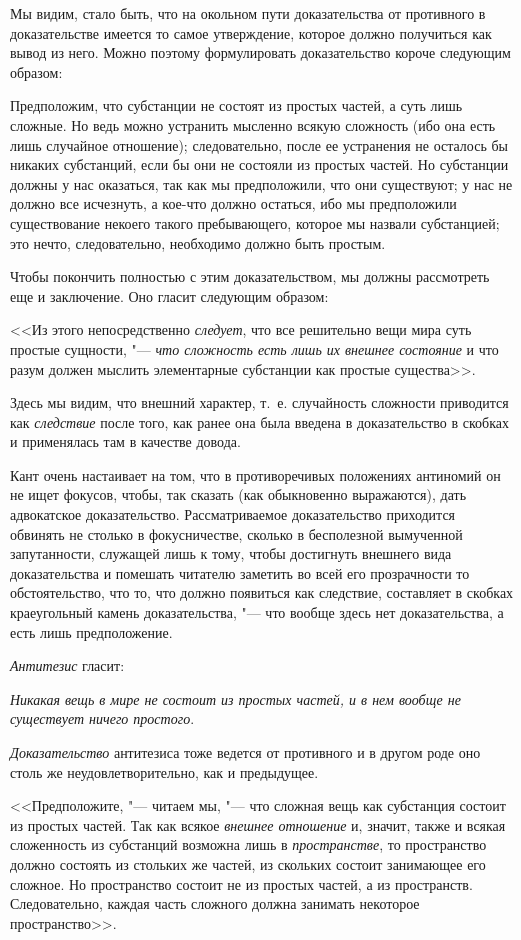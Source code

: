 Мы видим, стало быть, что на окольном пути доказательства от противного в
доказательстве имеется то самое утверждение, которое должно получиться как
вывод из него. Можно поэтому формулировать доказательство короче следующим
образом:

Предположим, что субстанции не состоят из простых частей, а суть лишь
сложные. Но ведь можно устранить мысленно всякую сложность (ибо она есть
лишь случайное отношение); следовательно, после ее устранения не осталось
бы никаких субстанций, если бы они не состояли из простых частей. Но
субстанции должны у нас оказаться, так как мы предположили, что они
существуют; у нас не должно все исчезнуть, а кое-что должно остаться, ибо
мы предположили существование некоего такого пребывающего, которое мы
назвали субстанцией; это нечто, следовательно, необходимо должно быть простым.

Чтобы покончить полностью с этим доказательством, мы должны рассмотреть еще
и заключение. Оно гласит следующим образом:

<<Из этого непосредственно {\em следует}, что все
решительно вещи мира суть простые сущности, "--- {\em что
сложность есть лишь их внешнее состояние} и что разум должен мыслить
элементарные субстанции как простые существа>>.

Здесь мы видим, что внешний характер, т.~е. случайность сложности приводится
как {\em следствие} после того, как ранее она была
введена в доказательство в скобках и применялась там в качестве довода.

Кант очень настаивает на том, что в противоречивых положениях антиномий он
не ищет фокусов, чтобы, так сказать (как обыкновенно выражаются), дать
адвокатское доказательство. Рассматриваемое доказательство приходится
обвинять не столько в фокусничестве, сколько в бесполезной вымученной
запутанности, служащей лишь к тому, чтобы достигнуть внешнего вида
доказательства и помешать читателю заметить во всей его прозрачности то
обстоятельство, что то, что должно появиться как следствие, составляет в
скобках краеугольный камень доказательства, "--- что вообще здесь нет
доказательства, а есть лишь предположение.

{\em Антитезис} гласит:

{\em Никакая вещь в мире не состоит из простых частей, и
в нем вообще не существует ничего простого}.

{\em Доказательство} антитезиса тоже ведется от
противного и в другом роде оно столь же неудовлетворительно, как и
предыдущее.

<<Предположите, "--- читаем мы, "--- что сложная вещь как субстанция состоит из
простых частей. Так как всякое {\em внешнее отношение}
и, значит, также и всякая сложенность из субстанций возможна лишь в
{\em пространстве}, то пространство должно состоять из
стольких же частей, из скольких состоит занимающее его сложное. Но
пространство состоит не из простых частей, а из пространств. Следовательно,
каждая часть сложного должна занимать некоторое пространство>>.

